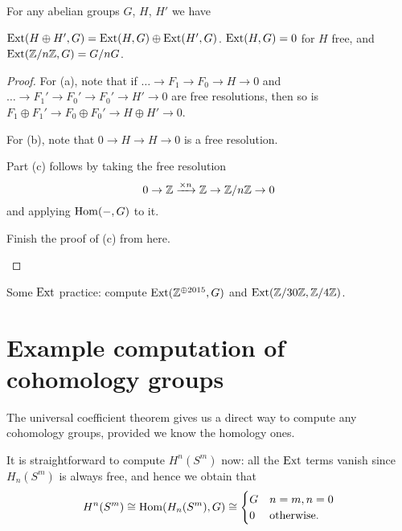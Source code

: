 \begin{lemma}
	For any abelian groups $G$, $H$, $H'$ we have
	\begin{enumerate}[(a)]
		\ii $\operatorname{Ext}(H \oplus H', G) = \operatorname{Ext}(H, G) \oplus \operatorname{Ext}(H', G)$.
		\ii $\operatorname{Ext}(H,G) = 0$ for $H$ free, and
		\ii $\operatorname{Ext}(\mathbb Z/n\mathbb Z, G) = G / nG$.
	\end{enumerate}
\end{lemma}
\begin{proof}
	For (a), note that if $\dots \to F_1 \to F_0 \to H \to 0$
	and $\dots \to F_1' \to F_0' \to F_0' \to H' \to 0$ are free resolutions,
	then so is $F_1 \oplus F_1' \to F_0 \oplus F_0' \to H \oplus H' \to 0$.

	For (b), note that $0 \to H \to H \to 0$ is a free resolution.

	Part (c) follows by taking the free resolution
	\[ 0 \to \mathbb Z \xrightarrow{\times n} \mathbb Z \to \mathbb Z/n\mathbb Z \to 0 \]
	and applying $\operatorname{Hom}(-,G)$ to it.
	\begin{ques}
		Finish the proof of (c) from here. \qedhere
	\end{ques}
\end{proof}

\begin{ques}
	Some $\operatorname{Ext}$ practice: compute
	$\operatorname{Ext}(\mathbb Z^{\oplus 2015}, G)$ and $\operatorname{Ext}(\mathbb Z/30\mathbb Z, \mathbb Z/4\mathbb Z)$.
\end{ques}

\section{Example computation of cohomology groups}

The universal coefficient theorem gives us a direct way to compute
any cohomology groups, provided we know the homology ones.

\begin{example}
	It is straightforward to compute $H^n(S^m)$ now:
	all the $\operatorname{Ext}$ terms vanish since $H_n(S^m)$ is always free,
	and hence we obtain that
	\[ H^n(S^m) \cong \operatorname{Hom}(H_n(S^m), G) \cong
		\begin{cases}
			G & n=m, n=0 \\
			0 & \text{otherwise}.
		\end{cases}
	\]
\end{example}

